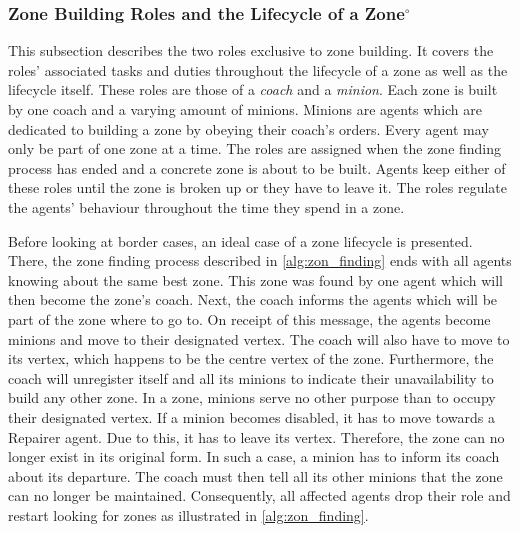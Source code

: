 \subsubsection[Zone Building Roles and the Lifecycle of a Zone]{Zone Building Roles and the Lifecycle of a Zone$^\circ$}\label{alg:zon_roles}
This subsection describes the two roles exclusive to zone building.
It covers the roles' associated tasks and duties throughout the lifecycle of a zone as well as the lifecycle itself.
These roles are those of a \emph{coach} and a \emph{minion}.
Each zone is built by one coach and a varying amount of minions.
Minions are agents which are dedicated to building a zone by obeying their coach's orders.
Every agent may only be part of one zone at a time.
The roles are assigned when the zone finding process has ended and a concrete zone is about to be built.
Agents keep either of these roles until the zone is broken up or they have to leave it.
The roles regulate the agents' behaviour throughout the time they spend in a zone.

Before looking at border cases, an ideal case of a zone lifecycle is presented.
There, the zone finding process described in \autoref{alg:zon_finding} ends with all agents knowing about the same best zone.
This zone was found by one agent which will then become the zone's coach.
Next, the coach informs the agents which will be part of the zone where to go to.
On receipt of this message, the agents become minions and move to their designated vertex.
The coach will also have to move to its vertex, which happens to be the centre vertex of the zone.
Furthermore, the coach will unregister itself and all its minions to indicate their unavailability to build any other zone.
In a zone, minions serve no other purpose than to occupy their designated vertex.
If a minion becomes disabled, it has to move towards a Repairer agent.
Due to this, it has to leave its vertex.
Therefore, the zone can no longer exist in its original form.
In such a case, a minion has to inform its coach about its departure.
The coach must then tell all its other minions that the zone can no longer be maintained.
Consequently, all affected agents drop their role and restart looking for zones as illustrated in \autoref{alg:zon_finding}.

